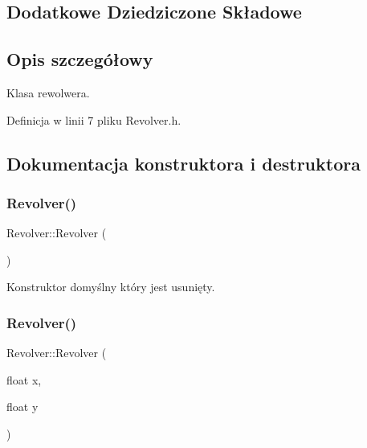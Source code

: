 \subsection*{Dodatkowe Dziedziczone Składowe}


\subsection{Opis szczegółowy}
Klasa rewolwera. 

Definicja w linii 7 pliku Revolver.\+h.



\subsection{Dokumentacja konstruktora i destruktora}
\mbox{\label{class_revolver_ab4d4360bde9164e0f697a7fe3f91d8aa}} 
\subsubsection{\texorpdfstring{Revolver()}{Revolver()}\hspace{0.1cm}{\footnotesize\ttfamily [1/2]}}
{\footnotesize\ttfamily Revolver\+::\+Revolver (\begin{DoxyParamCaption}{ }\end{DoxyParamCaption})\hspace{0.3cm}{\ttfamily [delete]}}



Konstruktor domyślny który jest usunięty. 

\mbox{\label{class_revolver_a91db226199031f40f2789321108e2569}} 
\subsubsection{\texorpdfstring{Revolver()}{Revolver()}\hspace{0.1cm}{\footnotesize\ttfamily [2/2]}}
{\footnotesize\ttfamily Revolver\+::\+Revolver (\begin{DoxyParamCaption}\item[{float}]{x,  }\item[{float}]{y }\end{DoxyParamCaption})}



